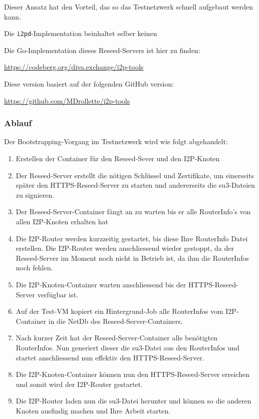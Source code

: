 Dieser Ansatz hat den Vorteil, das so das Testnetzwerk schnell aufgebaut werden kann.

Die \lstinline|i2pd|-Implementation beinhaltet selber keinen 

Die Go-Implementation dieses Reseed-Servers ist hier zu finden:

\url{https://codeberg.org/diva.exchange/i2p-tools}

Diese version basiert auf der folgenden GitHub version:

\url{https://github.com/MDrollette/i2p-tools}

\subsubsection{Ablauf}


Der Bootstrapping-Vorgang im Testnetzwerk wird wie folgt abgehandelt:

\begin{enumerate}
    \item Erstellen der Container für den Reseed-Sever und den I2P-Knoten
    \item Der Reseed-Server erstellt die nötigen Schlüssel und Zertifikate, um einerseits später den HTTPS-Reseed-Server zu starten und andererseits die su3-Dateien zu signieren.
    \item Der Reseed-Server-Container fängt an zu warten bis er alle RouterInfo's von allen I2P-Knoten erhalten hat
    \item Die I2P-Router werden kurzzeitig gestartet, bis diese Ihre RouterInfo Datei erstellen. Die I2P-Router werden anschliessend wieder gestoppt, da der Reseed-Server im Moment noch nicht in Betrieb ist, da ihm die RouterInfos noch fehlen.
    \item Die I2P-Knoten-Container warten anschliessend bis der HTTPS-Reseed-Server verfügbar ist.
    \item Auf der Test-VM kopiert ein Hintergrund-Job alle RouterInfos vom I2P-Container in die NetDb des Reseed-Server-Containers.
    \item Nach kurzer Zeit hat der Reseed-Server-Container alle benötigten RouterInfos. Nun generiert dieser die su3-Datei aus den RouterInfos und startet anschliessend nun effektiv den HTTPS-Reseed-Server.
    \item Die I2P-Knoten-Container können nun den HTTPS-Reseed-Server erreichen und somit wird der I2P-Router gestartet.
    \item Die I2P-Router laden nun die su3-Datei herunter und können so die anderen Knoten ausfindig machen und Ihre Arbeit starten.
\end{enumerate}

